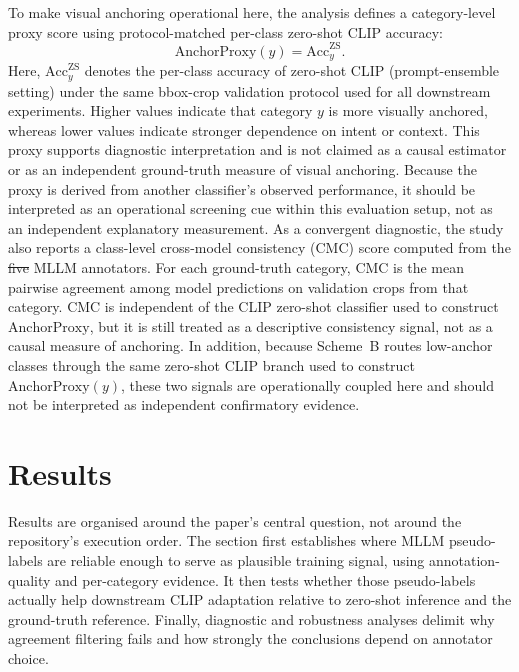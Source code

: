 \documentclass{ieeeaccess}
\providecommand{\DIFadd}[1]{{\protect\color{blue}\uwave{#1}}} %
\providecommand{\DIFdel}[1]{{\protect\color{red}\sout{#1}}}                      %
\providecommand{\DIFaddbegin}{} %
\providecommand{\DIFaddend}{} %
\providecommand{\DIFdelbegin}{} %
\providecommand{\DIFdelend}{} %
\newcommand{\DIFscaledelfig}{0.5}
\newlength{\DIFdelgraphicswidth} %
\newlength{\DIFdelgraphicsheight} %
\newcommand{\DIFaddincludegraphics}[2][]{{\color{blue}\fbox{\DIFOincludegraphics[#1]{#2}}}} %
\newcommand{\DIFdelincludegraphics}[2][]{%
\sbox{\DIFdelgraphicsbox}{\DIFOincludegraphics[#1]{#2}}%
\settoboxwidth{\DIFdelgraphicswidth}{\DIFdelgraphicsbox} %
\settoboxtotalheight{\DIFdelgraphicsheight}{\DIFdelgraphicsbox} %
\scalebox{\DIFscaledelfig}{%
\parbox[b]{\DIFdelgraphicswidth}{\usebox{\DIFdelgraphicsbox}\\[-\baselineskip] \rule{\DIFdelgraphicswidth}{0em}}\llap{\resizebox{\DIFdelgraphicswidth}{\DIFdelgraphicsheight}{%
\setlength{\unitlength}{\DIFdelgraphicswidth}%
\begin{picture}(1,1)%
\thicklines\linethickness{2pt} %
{\color[rgb]{1,0,0}\put(0,0){\framebox(1,1){}}}%
{\color[rgb]{1,0,0}\put(0,0){\line( 1,1){1}}}%
{\color[rgb]{1,0,0}\put(0,1){\line(1,-1){1}}}%
\end{picture}%
}\hspace*{3pt}}} %
} %
\DeclareRobustCommand{\DIFaddbegin}{\DIFOaddbegin \let\includegraphics\DIFaddincludegraphics} %
\DeclareRobustCommand{\DIFaddend}{\DIFOaddend \let\includegraphics\DIFOincludegraphics} %
\DeclareRobustCommand{\DIFdelbegin}{\DIFOdelbegin \let\includegraphics\DIFdelincludegraphics} %
\DeclareRobustCommand{\DIFdelend}{\DIFOaddend \let\includegraphics\DIFOincludegraphics} %
\begin{document}
To make visual anchoring operational here, the analysis
defines a category-level proxy score using protocol-matched per-class
zero-shot CLIP accuracy:
\[
\mathrm{AnchorProxy}(y)=\mathrm{Acc}^{\mathrm{ZS}}_{y}.
\]
Here, $\mathrm{Acc}^{\mathrm{ZS}}_{y}$ denotes the per-class accuracy of
zero-shot CLIP (prompt-ensemble setting) under the same bbox-crop
validation protocol used for all downstream experiments.
Higher values indicate that category $y$ is more visually anchored,
whereas lower values indicate stronger dependence on intent or context.
This proxy supports diagnostic interpretation and is not claimed as
a causal estimator or as an independent ground-truth measure of visual
anchoring.
Because the proxy is derived from another classifier's observed
performance, it should be interpreted as an operational screening cue
within this evaluation setup, not as an independent explanatory
measurement.
As a convergent diagnostic, the study also reports a class-level
cross-model consistency (CMC) score computed from the \DIFdelbegin \DIFdel{five }\DIFdelend \DIFaddbegin \DIFadd{ten }\DIFaddend MLLM
annotators. For each ground-truth category, CMC is the mean pairwise
agreement among model predictions on validation crops from that
category. CMC is independent of the CLIP zero-shot classifier used to
construct $\mathrm{AnchorProxy}$, but it is still treated as a
descriptive consistency signal, not as a causal measure of
anchoring.
In addition, because Scheme~B routes low-anchor classes through the
same zero-shot CLIP branch used to construct
$\mathrm{AnchorProxy}(y)$, these two signals are operationally
coupled here and should not be interpreted as independent
confirmatory evidence.

\section{Results}
\label{sec:results}

Results are organised around the paper's central question, not around
the repository's execution order.
The section first establishes where MLLM pseudo-labels are reliable
enough to serve as plausible training signal, using annotation-quality
and per-category evidence.
It then tests whether those pseudo-labels actually help downstream
CLIP adaptation relative to zero-shot inference and the ground-truth
reference.
Finally, diagnostic and robustness analyses delimit why agreement
filtering fails and how strongly the conclusions depend on annotator
choice.
\end{document}
